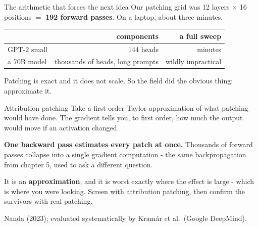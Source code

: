 \documentclass[aspectratio=169]{beamer}
\newcommand{\keybox}[1]{%
  \begin{tcolorbox}[colback=armblue!8, colframe=armblue, boxrule=0.6pt, arc=2pt]
  #1
  \end{tcolorbox}}
\newcommand{\watchbox}[1]{%
  \begin{tcolorbox}[colback=armorange!12, colframe=armorange, boxrule=0.6pt, arc=2pt]
  #1
  \end{tcolorbox}}
\begin{document}
\begin{frame}{The arithmetic that forces the next idea}
  \vspace{0.7em}
  Our patching grid was 12 layers $\times$ 16 positions $=$ \textbf{192 forward passes}. On a
  laptop, about three minutes.

  \vspace{0.8em}
  \begin{center}
  \small
  \begin{tabular}{@{}lrr@{}}
    \toprule
    & \textbf{components} & \textbf{a full sweep}\\
    \midrule
    GPT-2 small & 144 heads & minutes\\
    a 70B model & thousands of heads, long prompts & \textcolor{armred}{wildly impractical}\\
    \bottomrule
  \end{tabular}
  \end{center}

  \vspace{0.9em}
  Patching is exact and it does not scale. So the field did the obvious thing: approximate it.
\end{frame}

\begin{frame}{Attribution patching}
  \vspace{0.8em}
  Take a first-order Taylor approximation of what patching would have done. The gradient tells
  you, to first order, how much the output would move if an activation changed.

  \vspace{0.9em}
  \keybox{\textbf{One backward pass estimates every patch at once.} Thousands of forward passes
  collapse into a single gradient computation - the same backpropagation from chapter 5, used to
  ask a different question.}

  \vspace{0.6em}
  \watchbox{\small It is an \textbf{approximation}, and it is worst exactly where the effect is
  large - which is where you were looking. Screen with attribution patching, then confirm the
  survivors with real patching.}

  \vspace{0.3em}
  {\footnotesize Nanda (2023); evaluated systematically by Kram\'ar et al.\ (Google DeepMind).}
\end{frame}
\end{document}
